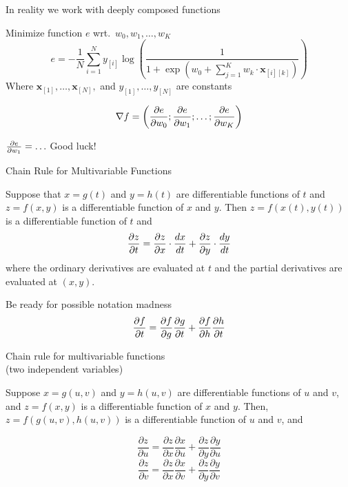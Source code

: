 \documentclass[12pt,aspectratio=169,handout]{beamer}
\begin{document}
\begin{frame}{In reality we work with deeply composed functions}
	
	\begin{example}
		Minimize function $e$ wrt.\ $w_0, w_1, \ldots, w_K$
		$$
		e = - \frac{1}{N} \sum_{i = 1}^{N} y_{[i]} \log
		\left(
		\frac{1}{1 +
			\exp\left( w_0 + \sum_{j=1}^{K} w_k \cdot \bm{x}_{[i][k]} \right)
		}
		\right)
		$$
		Where $\bm{x}_{[1]}, \ldots, \bm{x}_{[N]},$ and $y_{[1]}, \ldots, y_{[N]}$ are constants
	\end{example}
	
	\pause
	
	$$
	\nabla f = \left( \pdv{e}{w_0}; \pdv{e}{w_1}; \ldots; \pdv{e}{w_K} \right)
	$$
	
	$\pdv{e}{w_1} = \ldots$ \pause Good luck!
	
\end{frame}


\begin{frame}{Chain Rule for Multivariable Functions}
	
	
	Suppose that $x=g(t)$ and $y=h(t)$ are differentiable functions of $t$ and $z=f(x,y)$ is a differentiable function of $x$ and $y$. Then $z=f(x(t),y(t))$ is a differentiable function of $t$ and
	$$
	\pdv{z}{t} =  \pdv{z}{x} \cdot \frac{dx}{dt} + \pdv{z}{y} \cdot \frac{dy}{dt}
	$$
	where the ordinary derivatives are evaluated at $t$ and the partial derivatives are evaluated at $(x,y)$.
	
	\pause
	
	\begin{block}{Be ready for possible notation madness}
		$$
		\pdv{f}{t} =  \pdv{f}{g} \pdv{g}{t} + \pdv{f}{h} \pdv{h}{t}
		$$
	\end{block}
	
\end{frame}


\begin{frame}{Chain rule for multivariable functions \\ (two independent variables)}
	
	Suppose $x=g(u,v)$ and $y=h(u,v)$ are differentiable functions of $u$ and $v$, and $z=f(x,y)$ is a differentiable function of $x$ and $y$. Then, $z=f(g(u,v),h(u,v))$ is a differentiable function of $u$ and $v$, and
	
	$$
	\frac{\partial z}{\partial u} = \frac{\partial z}{\partial x} \frac{\partial x}{\partial u} + \frac{\partial z}{\partial y} \frac{\partial y}{\partial u}
	$$
	$$
	\frac{\partial z}{\partial v} = \frac{\partial z}{\partial x} \frac{\partial x}{\partial v} + \frac{\partial z}{\partial y} \frac{\partial y}{\partial v}
	$$
	
\end{frame}
\end{document}
